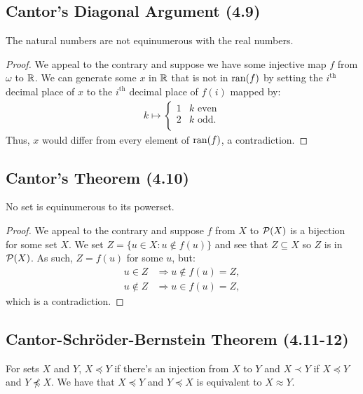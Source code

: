 \subsection{Cantor's Diagonal Argument (4.9)} \label{4.9}

The natural numbers are not equinumerous with the real numbers.

\begin{proof}
    We appeal to the contrary and suppose we have some injective map
    $f$ from $\omega$ to $\mathbb{R}$. We can generate some $x$ in $\mathbb{R}$ 
    that is not in $\operatorname{ran}(f)$ by setting the $i^{\text{th}}$ decimal place
    of $x$ to the $i^{\text{th}}$ decimal place of $f(i)$ mapped by: \begin{align*}
        k \mapsto \begin{cases}
            1 & k \text{ even} \\
            2 & k \text{ odd.} \\
        \end{cases}
    \end{align*} Thus, $x$ would differ from every element of $\operatorname{ran}(f)$, a 
    contradiction.
\end{proof}

\subsection{Cantor's Theorem (4.10)} \label{4.10}

No set is equinumerous to its powerset.

\begin{proof}
    We appeal to the contrary and suppose $f$ from $X$ to $\mathcal{P}(X)$ is a bijection
    for some set $X$. We set $Z = \{u \in X : u \notin f(u)\}$ and see that
    $Z \subseteq X$ so $Z$ is in $\mathcal{P}(X)$. As such, $Z = f(u)$ for some
    $u$, but:
    \begin{align*}
        u \in Z &\Longrightarrow u \notin f(u) = Z, \\
        u \notin Z &\Longrightarrow u \in f(u) = Z,
    \end{align*} which is a contradiction.
\end{proof}

\subsection{Cantor-Schröder-Bernstein Theorem (4.11-12)} 
\label{4.11} \label{4.12}

For sets $X$ and $Y$, $X \preceq Y$ if there's an injection from $X$ to $Y$
and $X \prec Y$ if $X \preceq Y$ and $Y \npreceq X$.
We have that $X \preceq Y$ and $Y \preceq X$ is equivalent
to $X \approx Y$.

